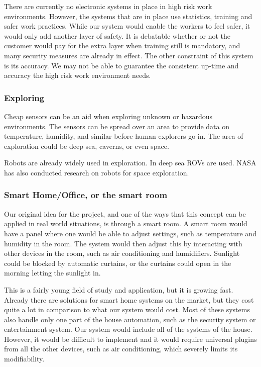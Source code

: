 \documentclass[../document]{subfiles}
\begin{document}
There are currently no electronic systems in place in high risk work environments. However, the systems that are in place use statistics, training and safer work practices. While our system would enable the workers to feel safer, it would only add another layer of safety. It is debatable whether or not the customer would pay for the extra layer when training still is mandatory, and many security measures are already in effect. The other constraint of this system is its accuracy. We may not be able to guarantee the consistent up-time and accuracy the high risk work environment needs.

\subsubsection{Exploring}
Cheap sensors can be an aid when exploring unknown or hazardous environments. The sensors can be spread over an area to provide data on temperature, humidity, and similar before human explorers go in. The area of exploration could be deep sea, caverns, or even space.

Robots are already widely used in exploration. In deep sea ROVs are used. NASA has also conducted research on robots for space exploration.

\subsubsection{Smart Home/Office, or the smart room}
Our original idea for the project, and one of the ways that this concept can be applied in real world situations, is through a smart room. A smart room would have a panel where one would be able to adjust settings, such as temperature and humidity in the room. The system would then adjust this by interacting with other devices in the room, such as air conditioning and humidifiers. Sunlight could be blocked by automatic curtains, or the curtains could open in the morning letting the sunlight in.

This is a fairly young field of study and application, but it is growing fast. Already there are solutions for smart home systems on the market, but they cost quite a lot in comparison to what our system would cost. Most of these systems also handle only one part of the house automation, such as the security system or entertainment system. Our system would include all of the systems of the house. However, it would be difficult to implement and it would require universal plugins from all the other devices, such as air conditioning, which severely limits its modifiability.
\end{document}
